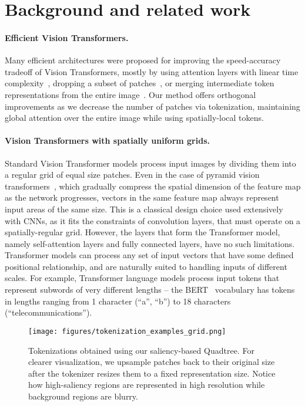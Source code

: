 \section{Background and related work}

\paragraph{Efficient Vision Transformers.} Many efficient architectures were proposed for improving the speed-accuracy tradeoff of Vision Transformers, mostly by using attention layers with linear time complexity~\cite{Arar2021LearnedQF,Liu2021SwinTH,Tu2022MaxViTMV}, dropping a subset of patches~\cite{Meng2021AdaViTAV,Rao2021DynamicViTEV,Yin2021AViTAT}, or merging intermediate token representations from the entire image~\cite{Renggli2022LearningTM,Bolya2022TokenMY}. Our method offers orthogonal improvements as we decrease the number of patches via tokenization, maintaining global attention over the entire image while using spatially-local tokens.


\paragraph{Vision Transformers with spatially uniform grids.} Standard Vision Transformer models process input images by dividing them into a regular grid of equal size patches. Even in the case of pyramid vision transformers~\cite{Wang2021PyramidVT,Liu2021SwinTH}, which gradually compress the spatial dimension of the feature map as the network progresses, vectors in the same feature map always represent input areas of the same size. This is a classical design choice used extensively with CNNs, as it fits the constraints of convolution layers, that must operate on a spatially-regular grid. However, the layers that form the Transformer model, namely self-attention layers and fully connected layers, have no such limitations. Transformer models can process any set of input vectors that have some defined positional relationship, and are naturally suited to handling inputs of different scales. For example, Transformer language models process input tokens that represent subwords of very different lengths -- the BERT~\cite{Devlin2019BERTPO} vocabulary has tokens in lengths ranging from 1 character (``a'', ``b'') to 18 characters (``telecommunications'').

\begin{figure}[t!]
  \centering
  \vspace*{-5pt}
  \texttt{[image: figures/tokenization\_examples\_grid.png]}
  \caption{Tokenizations obtained using our saliency-based Quadtree. For clearer visualization, we upsample patches back to their original size after the tokenizer resizes them to a fixed representation size. Notice how high-saliency regions are represented in high resolution while background regions are blurry.}
  \label{figure:more_quadtree_examples}
\end{figure}

